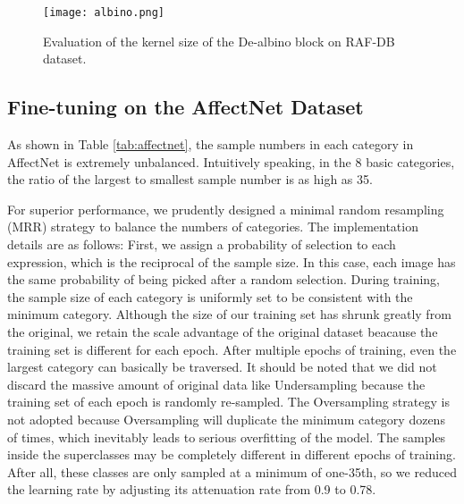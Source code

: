 \documentclass[10pt,twocolumn,letterpaper]{article}
\begin{document}
\begin{table}[t]
\begin{center}
\end{center}
\caption{Evaluation of the three blocks in ARM.}
\label{tab:ablation}
\end{table}
\begin{figure}[h]
\begin{center}
\texttt{[image: albino.png]}
\end{center}
   \caption{Evaluation of the kernel size  of the De-albino block on RAF-DB dataset.}
\label{fig:albino}
\end{figure}


\subsection{Fine-tuning on the AffectNet Dataset}
	As shown in Table \ref{tab:affectnet}, the sample numbers in each category in AffectNet \cite{affectnet} is extremely unbalanced. Intuitively speaking, in the 8 basic categories, the ratio of the largest to smallest sample number is as high as 35. 

	For superior performance, we prudently designed a minimal random resampling (MRR) strategy to balance the numbers of categories. The implementation details are as follows: First, we assign a probability of selection to each expression, which is the reciprocal of the sample size. In this case, each image has the same probability of being picked after a random selection. During training, the sample size of each category is uniformly set to be consistent with the minimum category. Although the size of our training set has shrunk greatly from the original, we retain the scale advantage of the original dataset beacause the training set is different for each epoch. After multiple epochs of training, even the largest category can basically be traversed. It should be noted that we did not discard the massive amount of original data like Undersampling because the training set of each epoch is randomly re-sampled. The Oversampling strategy is not adopted because Oversampling will duplicate the minimum category dozens of times, which inevitably leads to serious overfitting of the model. The samples inside the superclasses may be completely different in different epochs of training. After all, these classes are only sampled at a minimum of one-35th, so we reduced the learning rate by adjusting its attenuation rate from 0.9 to 0.78.
\end{document}
